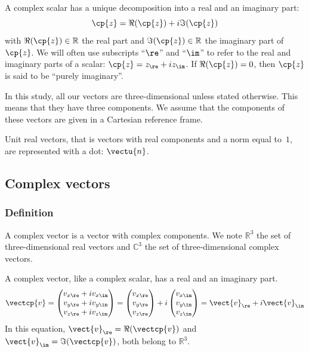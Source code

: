 \begin{refsection}
A complex scalar has a unique decomposition into a real and an imaginary part:
\begin{equation}
    \cp{z} = \Re(\cp{z}) + i \Im(\cp{z})
\end{equation}
with $\Re(\cp{z}) \in \mathbb{R}$ the real part and $\Im(\cp{z}) \in \mathbb{R}$ the imaginary part of $\cp{z}$.
We will often use subscripts ``$\re$'' and ``$\im$'' to refer to the real and imaginary parts of a scalar: $\cp{z} = z_\re + i z_\im$.
If $\Re(\cp{z})=0$, then $\cp{z}$ is said to be ``purely imaginary''.

In this study, all our vectors are three-dimensional unless stated otherwise.
This means that they have three components.
We assume that the components of these vectors are given in a Cartesian reference frame.

Unit real vectors, that is vectors with real components and a norm equal to~$1$, are represented with a dot: $\vectu{n}$.





\subsection{Complex vectors}

\subsubsection{Definition}
A complex vector is a vector with complex components.
We note
$\mathbb{R}^3$ the set of three-dimensional real vectors and
$\mathbb{C}^3$ the set of three-dimensional complex vectors.

A complex vector, like a complex scalar, has a real and an imaginary part.
\begin{equation}
    \vectcp{v}
    =
    \begin{pmatrix}
        v_{x\re} + i v_{x\im}\\
        v_{y\re} + i v_{y\im}\\
        v_{z\re} + i v_{z\im}
    \end{pmatrix}
    =
    \begin{pmatrix}
        v_{x\re}\\
        v_{y\re}\\
        v_{z\re}
    \end{pmatrix}
    +
    i
    \begin{pmatrix}
        v_{x\im}\\
        v_{y\im}\\
        v_{z\im}
    \end{pmatrix}
    =
    \vect{v}_\re + i \vect{v}_\im
\end{equation}
In this equation, $\vect{v}_\re = \Re(\vectcp{v})$ and $\vect{v}_\im = \Im(\vectcp{v})$,
both belong to $\mathbb{R}^3$.



\end{refsection}
